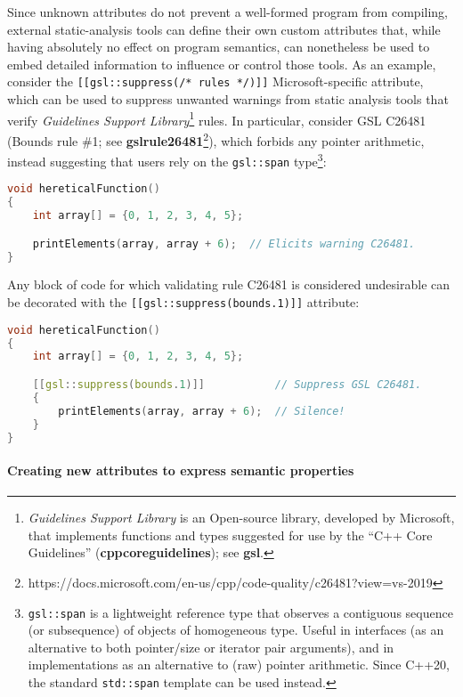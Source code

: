 \documentclass[twoside,10pt,letterpaper,usenames]{newstyle-PearsonGeneric-7-38}
\begin{document}
Since unknown attributes do not prevent a well-formed program from
compiling, external static-analysis tools can define their own custom
attributes that, while having absolutely no effect on program semantics,
can nonetheless be used to embed detailed information to influence or
control those tools. As an example, consider the
\texttt{[[gsl::suppress(/* rules */)]]} Microsoft-specific attribute,
which can be used to suppress unwanted warnings from static analysis
tools that verify \emph{Guidelines Support
Library}{\cprotect\footnote{\emph{Guidelines Support Library} is an
Open-source library, developed by Microsoft, that implements functions
and types suggested for use by the ``C++ Core Guidelines''
(\textbf{{cppcoreguidelines}}); see \textbf{{gsl}}.}} rules. In
particular, consider GSL C26481 (Bounds rule \#1; see
\textbf{{gslrule26481}}{\cprotect\footnote{https://docs.microsoft.com/en-us/cpp/code-quality/c26481?view=vs-2019}}),
which forbids any pointer arithmetic, instead suggesting that users rely
on the \texttt{gsl::span} type{\cprotect\footnote{\texttt{gsl::span} is
a lightweight reference type that observes a contiguous sequence (or
subsequence) of objects of homogeneous type. Useful in interfaces (as
an alternative to both pointer/size or iterator pair arguments), and
in implementations as an alternative to (raw) pointer arithmetic.
Since C++20, the standard \texttt{std::span} template can be used
instead.}}:

\begin{lstlisting}[language=C++]
void hereticalFunction()
{
    int array[] = {0, 1, 2, 3, 4, 5};

    printElements(array, array + 6);  // Elicits warning C26481.
}
\end{lstlisting}
    

Any block of code for which validating rule C26481 is considered
undesirable can be decorated with the
\texttt{[[gsl::suppress(bounds.1)]]} attribute:

\begin{lstlisting}[language=C++]
void hereticalFunction()
{
    int array[] = {0, 1, 2, 3, 4, 5};

    [[gsl::suppress(bounds.1)]]           // Suppress GSL C26481.
    {
        printElements(array, array + 6);  // Silence!
    }
}
\end{lstlisting}
    

\paragraph[Creating new attributes to express semantic properties]{Creating new attributes to express semantic properties}\label{creating-new-attributes-to-express-semantic-properties}
\end{document}
